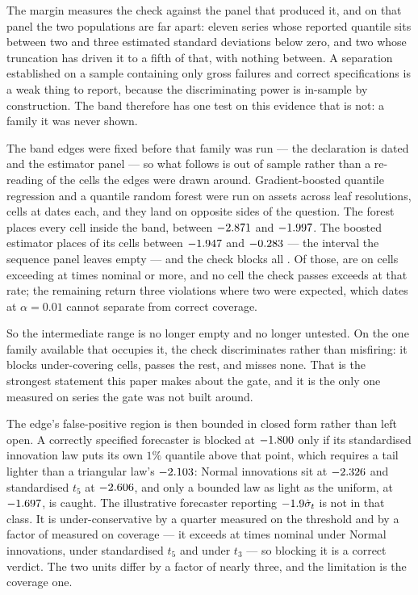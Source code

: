 \documentclass[preprint,11pt,authoryear]{elsarticle}
\newcommand{\1}{\boldsymbol{1}}
\begin{document}
The margin measures the check against the panel that produced it, and on that
panel the two populations are far apart: eleven series whose reported quantile
sits between two and three estimated standard deviations below zero, and two
whose truncation has driven it to a fifth of that, with nothing between. A
separation established on a sample containing only gross failures and correct
specifications is a weak thing to report, because the discriminating power is
in-sample by construction. The band therefore has one test on this evidence
that is not: a family it was never shown.

The band edges were fixed before that family was run --- the declaration is dated
\nMLBandDeclared{} and the estimator panel \nMLPanelRun{} --- so what follows is
out of sample rather than a re-reading of the cells the edges were drawn around.
Gradient-boosted quantile regression and a quantile random forest were run on
\nMLAssets{} assets across \nMLLeafSettings{} leaf resolutions, \nMLCells{} cells
at \nMLDates{} dates each, and they land on opposite sides of the question. The
forest places every cell inside the band, between $-2.871$ and
$-1.997$. The boosted estimator places \nMLGbmBlocked{} of its
\nMLGbmCells{} cells between $-1.947$ and $-0.283$ ---
the interval the sequence panel leaves empty --- and the check blocks all
\nMLGbmBlocked. Of those, \nMLBlockedUnder{} are on cells exceeding at
\nMLUnderThreshold{} times nominal or more, and no cell the check passes exceeds
at that rate; the remaining \nMLBlockedNotUnder{} return three violations where
two were expected, which \nMLDates{} dates at $\alpha = 0.01$ cannot separate
from correct coverage.

So the intermediate range is no longer empty and no longer untested. On the one
family available that occupies it, the check discriminates rather than misfiring:
it blocks under-covering cells, passes the rest, and misses none. That is the
strongest statement this paper makes about the gate, and it is the only one
measured on series the gate was not built around.

The edge's false-positive region is then bounded in closed form rather than left
open. A correctly specified forecaster is blocked at $-1.800$ only if its
standardised innovation law puts its own $1\%$ quantile above that point, which
requires a tail lighter than a triangular law's $-2.103$: Normal
innovations sit at $-2.326$ and standardised $t_5$ at $-2.606$,
and only a bounded law as light as the uniform, at $-1.697$, is caught.
The illustrative forecaster reporting $-1.9\hat\sigma_t$ is
not in that class. It is under-conservative by a quarter measured on the
threshold and by a factor of \nMLWorkedNormal{} measured on coverage --- it
exceeds at \nMLWorkedNormal{} times nominal under Normal innovations,
\nMLWorkedTFive{} under standardised $t_5$ and \nMLWorkedTThree{} under $t_3$ ---
so blocking it is a correct verdict. The two units differ by a factor of nearly
three, and the limitation is the coverage one.
\end{document}

